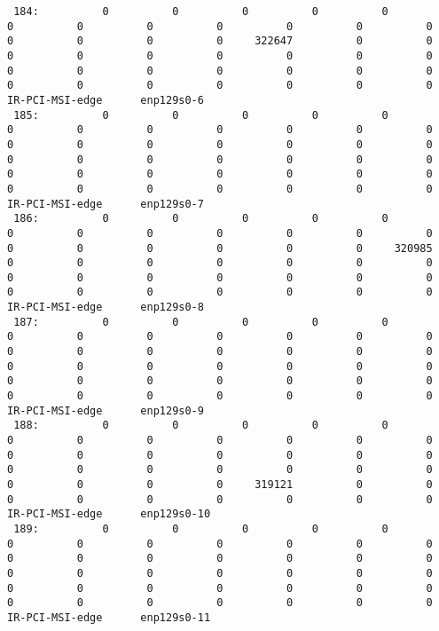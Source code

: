\begin{lstlisting}
 184:          0          0          0          0          0          0          0          0          0          0          0          0          0          0          0          0     322647          0          0          0          0          0          0          0          0          0          0          0          0          0          0          0          0          0          0          0          0          0          0          0  IR-PCI-MSI-edge      enp129s0-6
 185:          0          0          0          0          0          0          0          0          0          0          0          0          0          0          0          0          0          0          0          0          0          0          0          0          0          0          0          0          0          0          0          0          0          0          0          0          0          0          0          0  IR-PCI-MSI-edge      enp129s0-7
 186:          0          0          0          0          0          0          0          0          0          0          0          0          0          0          0          0          0          0     320985          0          0          0          0          0          0          0          0          0          0          0          0          0          0          0          0          0          0          0          0          0  IR-PCI-MSI-edge      enp129s0-8
 187:          0          0          0          0          0          0          0          0          0          0          0          0          0          0          0          0          0          0          0          0          0          0          0          0          0          0          0          0          0          0          0          0          0          0          0          0          0          0          0          0  IR-PCI-MSI-edge      enp129s0-9
 188:          0          0          0          0          0          0          0          0          0          0          0          0          0          0          0          0          0          0          0          0          0          0          0          0          0          0          0          0          0          0     319121          0          0          0          0          0          0          0          0          0  IR-PCI-MSI-edge      enp129s0-10
 189:          0          0          0          0          0          0          0          0          0          0          0          0          0          0          0          0          0          0          0          0          0          0          0          0          0          0          0          0          0          0          0          0          0          0          0          0          0          0          0          0  IR-PCI-MSI-edge      enp129s0-11

\end{lstlisting}
